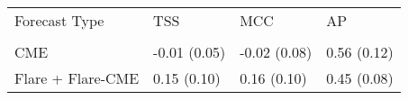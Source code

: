 \begin{tabular}{llll}
\toprule
Forecast Type & TSS & MCC & AP \\
 &  &  &  \\
\midrule
CME & -0.01 (0.05) & -0.02 (0.08) & 0.56 (0.12) \\
Flare + Flare-CME & 0.15 (0.10) & 0.16 (0.10) & 0.45 (0.08) \\
\bottomrule
\end{tabular}
